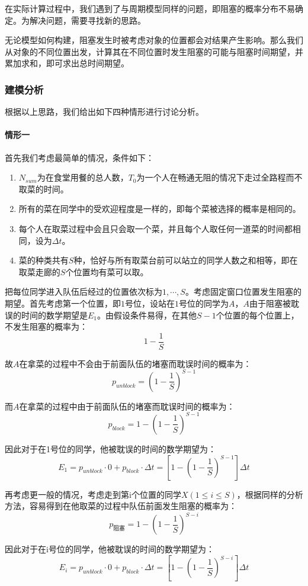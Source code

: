 \documentclass[lang=cn,10pt,a4paper]{elegantpaper}
\begin{document}
在实际计算过程中，我们遇到了与周期模型同样的问题，即阻塞的概率分布不易确定。为解决问题，需要寻找新的思路。


无论模型如何构建，阻塞发生时被考虑对象的位置都会对结果产生影响。那么我们从对象的不同位置出发，计算其在不同位置时发生阻塞的可能与阻塞时间期望，并累加求和，即可求出总时间期望。

\subsubsection{建模分析}
根据以上思路，我们给出如下四种情形进行讨论分析。
\paragraph{情形一}


首先我们考虑最简单的情况，条件如下：
\begin{enumerate}
\item $N_{sum}$为在食堂用餐的总人数，$T_0$为一个人在畅通无阻的情况下走过全路程而不取菜的时间。
\item 所有的菜在同学中的受欢迎程度是一样的，即每个菜被选择的概率是相同的。
\item 每个人在取菜过程中会且只会取一个菜，并且每个人取任何一道菜的时间都相同，设为$\Delta t$。
\item 菜的种类共有$S$种，恰好与所有取菜台前可以站立的同学人数之和相等，即在取菜走廊的$S$个位置均有菜可以取。
\end{enumerate}


把每位同学进入队伍后经过的位置依次标为$1,\cdots,S$。考虑固定窗口位置发生阻塞的期望。首先考虑第一个位置，即$1$号位，设站在$1$号位的同学为$A$，$A$由于阻塞被耽误的时间的数学期望是$E_1$。由假设条件易得，在其他$S-1$个位置的每个位置上，不发生阻塞的概率为：
$$
1- \frac{1}{S}
$$


故$A$在拿菜的过程中不会由于前面队伍的堵塞而耽误时间的概率为：
$$
p_{unblock}=(1-\frac{1}{S})^{S-1}
$$


而$A$在拿菜的过程中由于前面队伍的堵塞而耽误时间的概率为：
$$
p_{block}=1-(1-\frac{1}{S})^{S-1}
$$


因此对于在1号位的同学，他被耽误的时间的数学期望为：
$$
E_1=p_{unblock} \cdot 0+p_{block} \cdot \Delta t = [1-(1-\frac{1}{S})^{S-1}]\Delta t
$$


再考虑更一般的情况，考虑走到第i个位置的同学$X(1 \leqslant i \leqslant S)$，根据同样的分析方法，容易得到在他取菜的过程中队伍前面发生阻塞的概率为：
$$
p_{阻塞}=1-(1-\frac{1}{S})^{S-i}
$$


因此对于在i号位的同学，他被耽误的时间的数学期望为：
\begin{equation}
E_i=p_{unblock} \cdot 0+p_{block} \cdot \Delta t = [1-(1-\frac{1}{S})^{S-i}]\Delta t
\end{equation}
\end{document}
